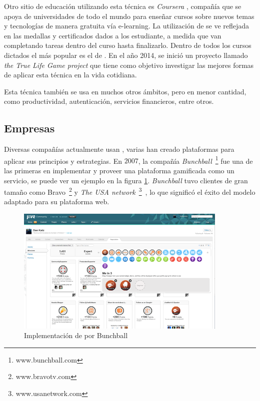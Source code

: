 Otro sitio de educación utilizando esta técnica es \emph{Coursera} \cite{Coursera},
compañía que se apoya de universidades de todo el mundo para enseñar
cursos sobre nuevos temas y tecnologías de manera gratuita vía e-learning.
La utilización de {\gam} se ve reflejada en las medallas y certificados dados
a los estudiante, a medida que van completando tareas dentro del curso
hasta finalizarlo.
Dentro de todos los cursos dictados el más popular es el de {\gam}\cite{Gam:Util:5}.
En el año 2014, se inició un proyecto llamado \emph{the True Life Game project}
que tiene como objetivo investigar las mejores formas de aplicar esta técnica en
la vida cotidiana.

Esta técnica también se usa en muchos otros ámbitos, pero en menor cantidad,
como productividad, autenticación, servicios financieros, entre otros.

\subsection{Empresas}

Diversas compañías actualmente usan {\gam}, varias han creado plataformas para
aplicar sus principios y estrategias.
En $2007$, la compañía \emph{Bunchball}~\footnote{www.bunchball.com} fue una de
las primeras en implementar y proveer una plataforma gamificada como un
servicio\cite{Gam:Bunchball:1}, se puede ver un ejemplo en la figura \ref{fig:bunch}.
\emph{Bunchball} tuvo clientes de gran tamaño como Bravo~\footnote{www.bravotv.com}
y \emph{The USA network}~\footnote{www.usanetwork.com}~\cite{Gam:Bunchball:2},
lo que significó el éxito del modelo adaptado para su plataforma web.

\begin{figure}[!htb]
  \centering
  \includegraphics[width=0.9\textwidth]{images/Gam_bunch.png}
  \caption[Implementación Bunchball]{Implementación de {\gam} por Bunchball}
  \label{fig:bunch}
\end{figure}


